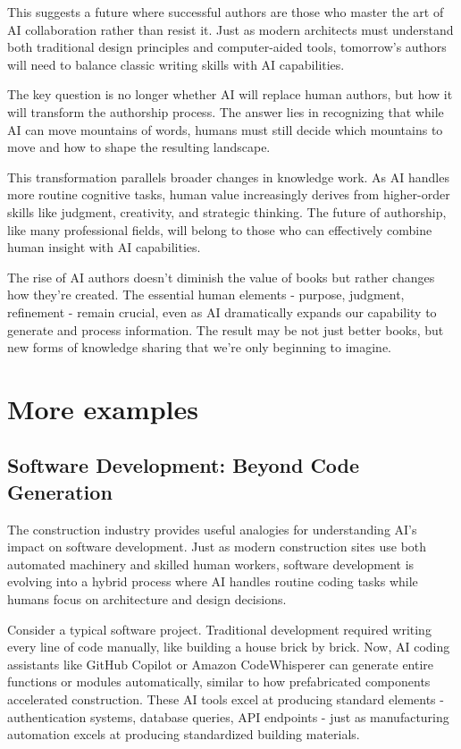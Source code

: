 \documentclass[
  Letterpaper,
]{scrbook}
\begin{document}
This suggests a future where successful authors are those who master the
art of AI collaboration rather than resist it. Just as modern architects
must understand both traditional design principles and computer-aided
tools, tomorrow's authors will need to balance classic writing skills
with AI capabilities.

The key question is no longer whether AI will replace human authors, but
how it will transform the authorship process. The answer lies in
recognizing that while AI can move mountains of words, humans must still
decide which mountains to move and how to shape the resulting landscape.

This transformation parallels broader changes in knowledge work. As AI
handles more routine cognitive tasks, human value increasingly derives
from higher-order skills like judgment, creativity, and strategic
thinking. The future of authorship, like many professional fields, will
belong to those who can effectively combine human insight with AI
capabilities.

The rise of AI authors doesn't diminish the value of books but rather
changes how they're created. The essential human elements - purpose,
judgment, refinement - remain crucial, even as AI dramatically expands
our capability to generate and process information. The result may be
not just better books, but new forms of knowledge sharing that we're
only beginning to imagine.

\section{More examples}\label{more-examples}

\subsection{Software Development: Beyond Code
Generation}\label{software-development-beyond-code-generation}

The construction industry provides useful analogies for understanding
AI's impact on software development. Just as modern construction sites
use both automated machinery and skilled human workers, software
development is evolving into a hybrid process where AI handles routine
coding tasks while humans focus on architecture and design decisions.

Consider a typical software project. Traditional development required
writing every line of code manually, like building a house brick by
brick. Now, AI coding assistants like GitHub Copilot or Amazon
CodeWhisperer can generate entire functions or modules automatically,
similar to how prefabricated components accelerated construction. These
AI tools excel at producing standard elements - authentication systems,
database queries, API endpoints - just as manufacturing automation
excels at producing standardized building materials.
\end{document}

